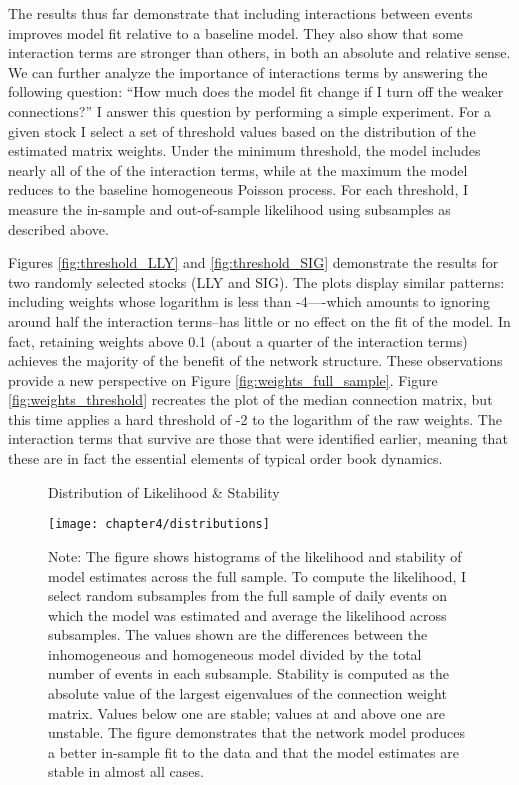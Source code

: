 		The results thus far demonstrate that including interactions between events improves model fit relative to a baseline model. They also show that some interaction terms are stronger than others, in both an absolute and relative sense. We can further analyze the importance of interactions terms by answering the following question: “How much does the model fit change if I turn off the weaker connections?” I answer this question by performing a simple experiment. For a given stock I select a set of threshold values based on the distribution of the estimated matrix weights. Under the minimum threshold, the model includes nearly all of the of the interaction terms, while at the maximum the model reduces to the baseline homogeneous Poisson process. For each threshold, I measure the in-sample and out-of-sample likelihood using subsamples as described above.

		Figures \ref{fig:threshold_LLY} and \ref{fig:threshold_SIG} demonstrate the results for two randomly selected stocks (LLY and SIG). The plots display similar patterns: including weights whose logarithm is less than -4—-which amounts to ignoring around half the interaction terms--has little or no effect on the fit of the model. In fact, retaining weights above 0.1 (about a quarter of the interaction terms) achieves the majority of the benefit of the network structure. These observations provide a new perspective on Figure \ref{fig:weights_full_sample}. Figure \ref{fig:weights_threshold} recreates the plot of the median connection matrix, but this time applies a hard threshold of -2 to the logarithm of the raw weights. The interaction terms that survive are those that were identified earlier, meaning that these are in fact the essential elements of typical order book dynamics.

		\begin{figure}[ht!]
			\small
			\linespread{1}
			\centering
			\captionsetup{labelsep=colon, font=footnotesize, justification=centerfirst, width=\linewidth}
			\caption{Distribution of Likelihood \& Stability}
			\label{fig:distributions}
			\texttt{[image: chapter4/distributions]}
			\captionsetup{position=below, font=footnotesize, justification=justified, width=\linewidth}
			\caption*{Note: The figure shows histograms of the likelihood and stability of model estimates across the full sample. To compute the likelihood, I select random subsamples from the full sample of daily events on which the model was estimated and average the likelihood across subsamples. The values shown are the differences between the inhomogeneous and homogeneous model divided by the total number of events in each subsample. Stability is computed as the absolute value of the largest eigenvalues of the connection weight matrix. Values below one are stable; values at and above one are unstable.  The figure demonstrates that the network model produces a better in-sample fit to the data and that the model estimates are stable in almost all cases.}
		\end{figure}

